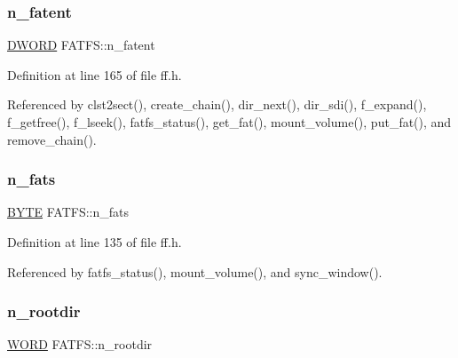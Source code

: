 \mbox{\label{structFATFS_a8da50eeba6469bc20d60ca0cf9a1307c}} 
\subsubsection{\texorpdfstring{n\+\_\+fatent}{n\_fatent}}
{\footnotesize\ttfamily \hyperlink{ff_8h_ad342ac907eb044443153a22f964bf0af}{D\+W\+O\+RD} F\+A\+T\+F\+S\+::n\+\_\+fatent}



Definition at line 165 of file ff.\+h.



Referenced by clst2sect(), create\+\_\+chain(), dir\+\_\+next(), dir\+\_\+sdi(), f\+\_\+expand(), f\+\_\+getfree(), f\+\_\+lseek(), fatfs\+\_\+status(), get\+\_\+fat(), mount\+\_\+volume(), put\+\_\+fat(), and remove\+\_\+chain().

\mbox{\label{structFATFS_a56716c7e7ac10cf46e73ffb2a2e9b545}} 
\subsubsection{\texorpdfstring{n\+\_\+fats}{n\_fats}}
{\footnotesize\ttfamily \hyperlink{ff_8h_a4ae1dab0fb4b072a66584546209e7d58}{B\+Y\+TE} F\+A\+T\+F\+S\+::n\+\_\+fats}



Definition at line 135 of file ff.\+h.



Referenced by fatfs\+\_\+status(), mount\+\_\+volume(), and sync\+\_\+window().

\mbox{\label{structFATFS_a189a00aa038044ffad0fc7f7dcf2aae1}} 
\subsubsection{\texorpdfstring{n\+\_\+rootdir}{n\_rootdir}}
{\footnotesize\ttfamily \hyperlink{ff_8h_a197942eefa7db30960ae396d68339b97}{W\+O\+RD} F\+A\+T\+F\+S\+::n\+\_\+rootdir}



